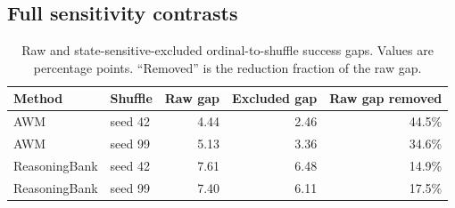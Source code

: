 \subsection{Full sensitivity contrasts}
\begin{table}[h]
\centering
\caption{Raw and state-sensitive-excluded ordinal-to-shuffle success gaps. Values are percentage points. ``Removed'' is the reduction fraction of the raw gap.}
\small
\begin{tabular}{llrrr}
\toprule
Method & Shuffle & Raw gap & Excluded gap & Raw gap removed \\
\midrule
AWM & seed 42 & 4.44 & 2.46 & 44.5\% \\
AWM & seed 99 & 5.13 & 3.36 & 34.6\% \\
ReasoningBank & seed 42 & 7.61 & 6.48 & 14.9\% \\
ReasoningBank & seed 99 & 7.40 & 6.11 & 17.5\% \\
\bottomrule
\end{tabular}
\end{table}
